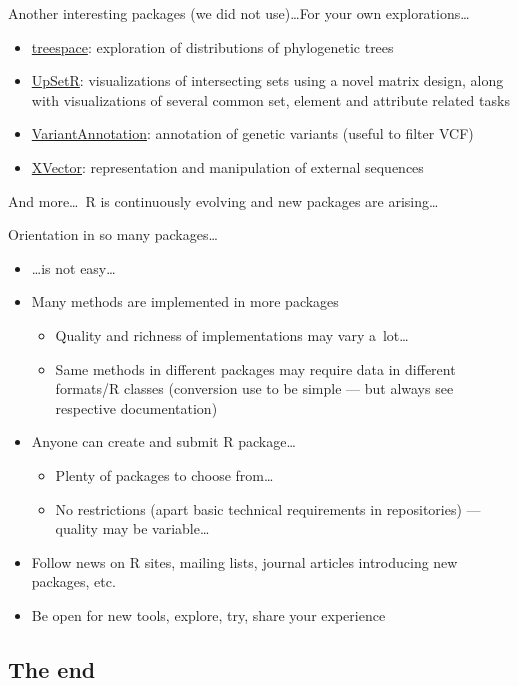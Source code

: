 \documentclass[compress, ucs, xelatex, 11pt, xcolor=svgnames, aspectratio=169,
	hyperref={
		bookmarks=true,
		unicode=true,
		colorlinks=true,
		pdftitle={Molecular data in R},
		plainpages=false,
		pdfauthor={Vojtech Zeisek},
		pdfsubject={Course about phylogeny and evolution in R},
		pdfcreator={XeLaTeX},
		pdfkeywords={R, evolution, phylogeny, molecular data},
		linkcolor=Crimson, %
		anchorcolor=Magenta, %
		citecolor=Magenta, %
		filecolor=Magenta, %
		menucolor=Magenta, %
		urlcolor=DodgerBlue, %
		pdftex},
	url={hyphens, lowtilde} %
	]{beamer}
\begin{document}
\begin{frame}[allowframebreaks]{Another interesting packages (we did not use)\ldots}{For your own explorations\ldots}
\begin{itemize}
		\item \href{https://CRAN.R-project.org/package=treespace}{treespace}: exploration of distributions of phylogenetic trees
		\item \href{https://CRAN.R-project.org/package=UpSetR}{UpSetR}: visualizations of intersecting sets using a novel matrix design, along with visualizations of several common set, element and attribute related tasks
		\item \href{https://bioconductor.org/packages/VariantAnnotation/}{VariantAnnotation}: annotation of genetic variants (useful to filter VCF)
		\item \href{https://bioconductor.org/packages/release/bioc/html/XVector.html}{XVector}: representation and manipulation of external sequences
	\end{itemize}
	And more\ldots~R is continuously evolving and new packages are arising\ldots
\end{frame}

\begin{frame}{Orientation in so many packages\ldots}
	\begin{itemize}
		\item \ldots is not easy\ldots
		\item Many methods are implemented in more packages
		\begin{itemize}
			\item Quality and richness of implementations may vary a~lot\ldots
			\item Same methods in different packages may require data in different formats/R classes (conversion use to be simple --- but always see respective documentation)
		\end{itemize}
		\item Anyone can create and submit R package\ldots
		\begin{itemize}
			\item Plenty of packages to choose from\ldots
			\item No restrictions (apart basic technical requirements in repositories) --- quality may be variable\ldots
		\end{itemize}
		\item Follow news on R sites, mailing lists, journal articles introducing new packages, etc.
		\item Be open for new tools, explore, try, share your experience
	\end{itemize}
\end{frame}

\subsection{The end}
\end{document}
